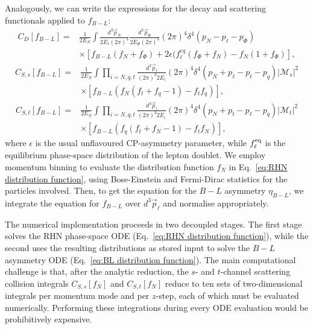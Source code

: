 \documentclass[12pt, a4paper]{article}
\begin{document}
Analogously, we can write the expressions for the decay and scattering functionals applied to $f_{B-L}$:
\begin{equation}
\label{eq: decay B-L}
 \begin{aligned}
  C_D\left[f_{B-L}\right]= & \frac{1}{2 E_N} \int \frac{d^3 \vec{p}_N}{2 E_\ell(2 \pi)^3} \frac{d^3 \vec{p}_{\Phi}}{2 E_{\Phi}(2 \pi)^3}(2 \pi)^4 \delta^4\left(p_N-p_\ell-p_{\Phi}\right) \\
  & \times\left[f_{B-L}(f_N+f_{\Phi})+2\epsilon(f_\ell^{eq}\left(f_{\Phi}+f_N\right)-f_N(1+f_\Phi)\right],
 \end{aligned}
\end{equation}
%
\begin{equation}
\label{eq:s-channel scattering B-L}
 \begin{aligned}
C_{S, s}\left[f_{B-L}\right] = &\frac{1}{2 E_N} \int \prod_{i=N, q, t} \frac{d^3 \vec{p}_i}{(2 \pi)^3 2 E_i}(2 \pi)^4 \delta^4\left(p_N+p_\ell-p_t-p_q\right)\left|\mathcal{M}_s\right|^2 \\
& \times\left[f_{B-L}\left(f_N\left(f_t+f_q-1\right)-f_tf_q\right)\right],
\end{aligned}
\end{equation}
%
\begin{equation}
\label{eq:t-channel scattering B-L}
 \begin{aligned}
C_{S, t}\left[f_{B-L}\right] = &\frac{1}{2 E_N} \int \prod_{i=N, q, t} \frac{d^3 \vec{p}_i}{(2 \pi)^3 2 E_i}(2 \pi)^4 \delta^4\left(p_N+p_t-p_\ell-p_q\right)\left|\mathcal{M}_t\right|^2 \\
& \times\left[f_{B-L}\left(f_q\left(f_t+f_N-1\right)-f_tf_N\right)\right],
\end{aligned}
\end{equation}
%
 where $\epsilon$ is the usual unflavoured CP-asymmetry parameter, while $f_\ell^{\rm eq}$ is the equilibrium phase-space distribution of the lepton doublet. We employ momentum binning to evaluate the distribution function $f_N$ in Eq.~\eqref{eq:RHN distribution function}, using Bose-Einstein and Fermi-Dirac statistics for the particles involved. 
Then, to get the equation for the $B-L$ asymmetry $\eta_{B-L}$, we integrate the equation for $f_{B-L}$ over $d^3\vec{p}_\ell$ and normalise appropriately. 

The numerical implementation proceeds in two decoupled stages. The first stage solves the RHN phase-space ODE (Eq.~\eqref{eq:RHN distribution function}), while the second uses the resulting distributions as stored input to solve the $B-L$ asymmetry ODE (Eq.~\eqref{eq:BL distribution function}). The main computational challenge is that, after the analytic reduction, the $s$- and $t$-channel scattering collision integrals $C_{S,s}[f_N]$ and $C_{S,t}[f_N]$ reduce to ten sets of two-dimensional integrals per momentum mode and per $z$-step, each of which must be evaluated numerically. Performing these integrations during every ODE evaluation would be prohibitively expensive.
\end{document}
